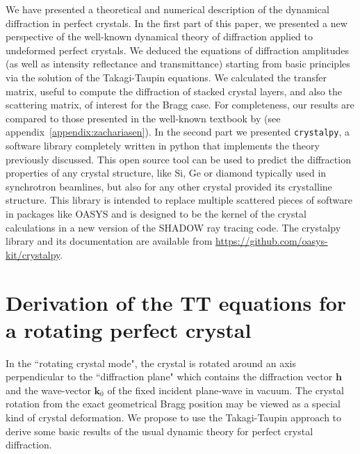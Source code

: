 \documentclass[preprint]{iucr}              %
\begin{document}
We have presented a theoretical and numerical description of the dynamical diffraction in perfect crystals. In the first part of this paper, we presented a new perspective of the well-known dynamical theory of diffraction applied to undeformed perfect crystals. We deduced the equations of diffraction amplitudes (as well as intensity reflectance and transmittance) starting from basic principles via the solution of the Takagi-Taupin equations. We calculated the transfer matrix, useful to compute the diffraction of stacked crystal layers, and also the scattering matrix, of interest for the Bragg case. For completeness, our results are compared to those presented in the well-known textbook by \cite{ZachariasenBook} (see appendix~\ref{appendix:zachariasen}).
In the second part we presented {\tt crystalpy}, a software library completely written in python that implements the theory previously discussed. This open source tool can be used to predict the diffraction properties of any crystal structure, like Si, Ge or diamond typically used in synchrotron beamlines, but also for any other crystal provided its crystalline structure. This library is intended to replace multiple scattered pieces of software in packages like OASYS \cite{codeOASYS} and is designed to be the kernel of the crystal calculations in a new version of the SHADOW \cite{codeSHADOW} ray tracing code. The crystalpy library and its documentation are available from \url{https://github.com/oasys-kit/crystalpy}. 






\appendix

\section{Derivation of the TT equations for a rotating perfect crystal}
\label{appendix:rotating}

In the ``rotating crystal mode", the crystal is rotated around an axis perpendicular to the ``diffraction plane" which contains the diffraction vector $\textbf{h}$ and the wave-vector $\textbf{k}_0$ of the fixed incident plane-wave in vacuum. The crystal rotation from the exact geometrical Bragg position may be viewed as a special kind of crystal deformation. We propose to use the Takagi-Taupin approach to derive some basic results of the usual dynamic theory for perfect crystal diffraction. 
\end{document}
